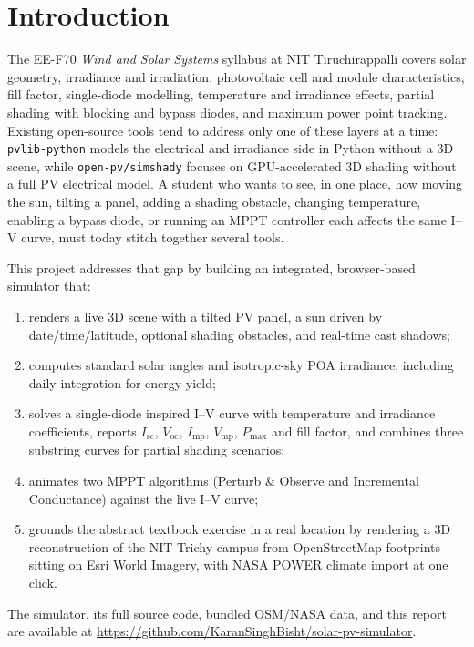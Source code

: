 \documentclass[conference]{IEEEtran}
\begin{document}
\section{Introduction}
The EE-F70 \emph{Wind and Solar Systems} syllabus at NIT Tiruchirappalli covers solar geometry, irradiance and irradiation, photovoltaic cell and module characteristics, fill factor, single-diode modelling, temperature and irradiance effects, partial shading with blocking and bypass diodes, and maximum power point tracking. Existing open-source tools tend to address only one of these layers at a time: \texttt{pvlib-python}\cite{pvlib} models the electrical and irradiance side in Python without a 3D scene, while \texttt{open-pv/simshady}\cite{simshady} focuses on GPU-accelerated 3D shading without a full PV electrical model. A student who wants to see, in one place, how moving the sun, tilting a panel, adding a shading obstacle, changing temperature, enabling a bypass diode, or running an MPPT controller each affects the same I--V curve, must today stitch together several tools.

This project addresses that gap by building an integrated, browser-based simulator that:
\begin{enumerate}
\item renders a live 3D scene with a tilted PV panel, a sun driven by date/time/latitude, optional shading obstacles, and real-time cast shadows;
\item computes standard solar angles and isotropic-sky POA irradiance, including daily integration for energy yield;
\item solves a single-diode inspired I--V curve with temperature and irradiance coefficients, reports $I_\text{sc}$, $V_\text{oc}$, $I_\text{mp}$, $V_\text{mp}$, $P_\text{max}$ and fill factor, and combines three substring curves for partial shading scenarios;
\item animates two MPPT algorithms (Perturb \& Observe and Incremental Conductance) against the live I--V curve;
\item grounds the abstract textbook exercise in a real location by rendering a 3D reconstruction of the NIT Trichy campus from OpenStreetMap footprints sitting on Esri World Imagery, with NASA POWER climate import at one click.
\end{enumerate}

The simulator, its full source code, bundled OSM/NASA data, and this report are available at \url{https://github.com/KaranSinghBisht/solar-pv-simulator}.
\end{document}
